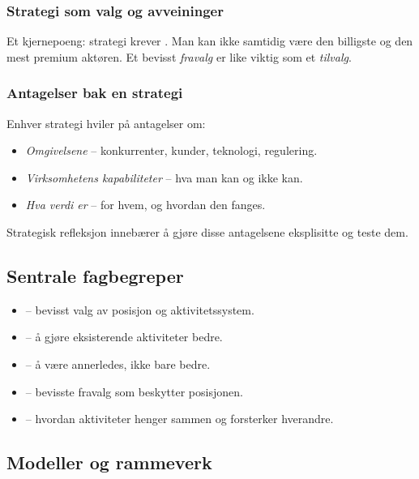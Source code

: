 \subsubsection*{Strategi som valg og avveininger}
Et kjernepoeng: strategi krever . Man kan ikke samtidig være
den billigste og den mest premium aktøren. Et bevisst \emph{fravalg} er like
viktig som et \emph{tilvalg}.

\subsubsection*{Antagelser bak en strategi}
Enhver strategi hviler på antagelser om:
\begin{itemize}
  \item \emph{Omgivelsene} -- konkurrenter, kunder, teknologi, regulering.
  \item \emph{Virksomhetens kapabiliteter} -- hva man kan og ikke kan.
  \item \emph{Hva verdi er} -- for hvem, og hvordan den fanges.
\end{itemize}
Strategisk refleksjon innebærer å gjøre disse antagelsene eksplisitte og teste dem.

\subsection{Sentrale fagbegreper}
\begin{itemize}
  \item {} -- bevisst valg av posisjon og aktivitetssystem.
  \item {} -- å gjøre eksisterende aktiviteter bedre.
  \item {} -- å være annerledes, ikke bare bedre.
  \item {} -- bevisste fravalg som beskytter posisjonen.
  \item {} -- hvordan aktiviteter henger sammen og forsterker hverandre.
\end{itemize}

\subsection{Modeller og rammeverk}


